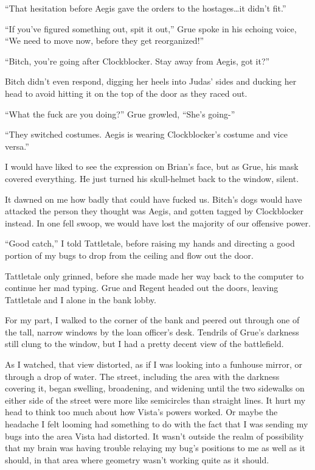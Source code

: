 ``That hesitation before Aegis gave the orders to the hostages\ldots it didn't fit.''



``If you've figured something out, spit it out,'' Grue spoke in his echoing voice, ``We need to move now, before they get reorganized!''



``Bitch, you're going after Clockblocker.  Stay away from Aegis, got it?''



Bitch didn't even respond, digging her heels into Judas' sides and ducking her head to avoid hitting it on the top of the door as they raced out.



``What the fuck are you doing?'' Grue growled, ``She's going-''



``They switched costumes.   Aegis is wearing Clockblocker's costume and vice versa.''



I would have liked to see the expression on Brian's face, but as Grue, his mask covered everything.  He just turned his skull-helmet back to the window, silent.



It dawned on me how badly that could have fucked us.  Bitch's dogs would have attacked the person they thought was Aegis, and gotten tagged by Clockblocker instead.  In one fell swoop, we would have lost the majority of our offensive power.



``Good catch,'' I told Tattletale, before raising my hands and directing a good portion of my bugs to drop from the ceiling and flow out the door.



Tattletale only grinned, before she made made her way back to the computer to continue her mad typing.  Grue and Regent headed out the doors, leaving Tattletale and I alone in the bank lobby.



For my part, I walked to the corner of the bank and peered out through one of the tall, narrow windows by the loan officer's desk.  Tendrils of Grue's darkness still clung to the window, but I had a pretty decent view of the battlefield.



As I watched, that view distorted, as if I was looking into a funhouse mirror, or through a drop of water.  The street, including the area with the darkness covering it, began swelling, broadening, and widening until the two sidewalks on either side of the street were more like semicircles than straight lines.  It hurt my head to think too much about how Vista's powers worked.  Or maybe the headache I felt looming had something to do with the fact that I was sending my bugs into the area Vista had distorted.  It wasn't outside the realm of possibility that my brain was having trouble relaying my bug's positions to me as well as it should, in that area where geometry wasn't working quite as it should.



